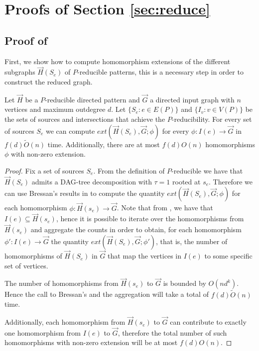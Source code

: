 \documentclass[a4paper,UKenglish,cleveref, autoref, numberwithinsect, thm-restate]{lipics-v2021}
\newcommand{\reducible}[1]{${#1}$-reducible}
\newcommand{\maxoutdeg}{d}
\newcommand{\extension}[3]{ext\left(#1,#2;#3\right)}
\newcommand{\dtw}{\tau}
\newcommand{\dagtree}{DAG-tree decomposition}
\begin{document}
	
	
	\newpage
	\appendix
	\section{Proofs of Section \ref{sec:reduce}}
	
	\subsection{Proof of }
	
	First, we show how to compute homomorphism extensions of the different subgraphs $\vec{H}(S_e)$ of \reducible{P} patterns, this is a necessary step in order to construct the reduced graph.
	
	\begin{lemma} \label{lem:extension_subgraphs}
		Let $\vec{H}$ be a \reducible{P} directed pattern and $\vec{G}$ a directed input graph with $n$ vertices and maximum outdegree $\maxoutdeg$. Let $\{S_e : e\in E(P)\}$ and $\{I_v : v\in V(P)\}$ be the sets of sources and intersections that achieve the $P$-reducibility. For every set of sources $S_e$ we can compute $\extension{\vec{H}(S_e)}{\vec{G}}{\phi}$ for every $\phi: I(e) \to \vec{G}$ in $f(\maxoutdeg)\tilde{O}(n)$ time. Additionally, there are at most $f(\maxoutdeg)O(n)$ homomorphisms $\phi$ with non-zero extension.
	\end{lemma}
	\begin{proof}
		Fix a set of sources $S_e$. From the definition of \reducible{P} we have that $\vec{H}(S_e)$ admits a \dagtree{} with $\dtw=1$ rooted at $s_e$. Therefore we can use Bressan's results in  to compute the quantity $\extension{\vec{H}(S_e)}{\vec{G}}{\phi}$ for each homomorphism $\phi: \vec{H}(s_e) \to \vec{G}$. Note that from , we have that $I(e) \subseteq \vec{H}(s_e)$, hence it is possible to iterate over the homomorphisms from $\vec{H}(s_e)$ and aggregate the counts in order to obtain, for each homomorphism $\phi': I(e)\to \vec{G}$ the quantity $\extension{\vec{H}(S_e)}{\vec{G}}{\phi'}$, that is, the number of homomorphisms of $\vec{H}(S_e)$ in $\vec{G}$ that map the vertices in $I(e)$ to some specific set of vertices.
		
		The number of homomorphisms from $\vec{H}(s_e)$ to $\vec{G}$ is bounded by $O(n \maxoutdeg^k)$. Hence the call to Bressan's and the aggregation will take a total of $f(\maxoutdeg)\tilde{O}(n)$ time.
		
		Additionally, each homomorphism from $\vec{H}(s_e)$ to $\vec{G}$ can contribute to exactly one homomorphism from $I(e)$ to $\vec{G}$, therefore the total number of such homomorphisms with non-zero extension will be at most $f(\maxoutdeg)O(n)$.
	\end{proof}
	
\end{document}
